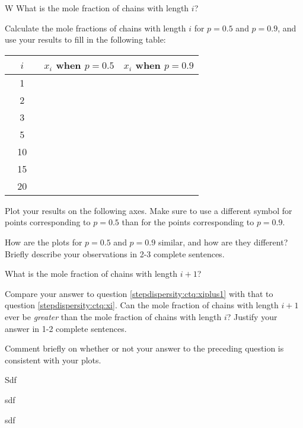 \begin{activity}
\begin{infobox}
\end{infobox}

\begin{ctqs}
	\question \label{stepdispersity:ctq:xi} W What is the mole fraction of chains with length $i$?
	
	\question Calculate the mole fractions of chains with length $i$ for $p=0.5$ and $p=0.9$, and use your results to fill in the following table:
	
		\begin{center}
			\renewcommand{\arraystretch}{4}
			\begin{tabular}{|c|c|c|}
				\hline
				\textbf{~~$i$~~} & $x_i$ when $p=0.5$ & $x_i$ when $p=0.9$ \\\hline
				1 & & \\\hline
				2 & & \\\hline
				3 & & \\\hline
				5 & & \\\hline
				10 & & \\\hline
				15 & & \\\hline
				20 & & \\\hline
			\end{tabular}
		\end{center}
		
	\question Plot your results on the following axes.  Make sure to use a different symbol for points corresponding to $p=0.5$ than for the points corresponding to $p=0.9$.
	
	\question How are the plots for $p=0.5$ and $p=0.9$ similar, and how are they different?  Briefly describe your observations in 2-3 complete sentences.
	
	\question \label{stepdispersity:ctq:xiplus1} What is the mole fraction of chains with length $i+1$?
	
	\question Compare your answer to question \ref{stepdispersity:ctq:xiplus1} with that to question \ref{stepdispersity:ctq:xi}. Can the mole fraction of chains with length $i+1$ ever be \emph{greater} than the mole fraction of chains with length $i$?  Justify your answer in 1-2 complete sentences.
	
	\question Comment briefly on whether or not your answer to the preceding question is consistent with your plots.
	
\end{ctqs}


\begin{model}[$M_n$ and $M_w$]

Sdf

\end{model}

\begin{ctqs}
		\question sdf
			
\end{ctqs}

\begin{exercises}

		\exercise sdf
\end{exercises}
	
\end{activity}